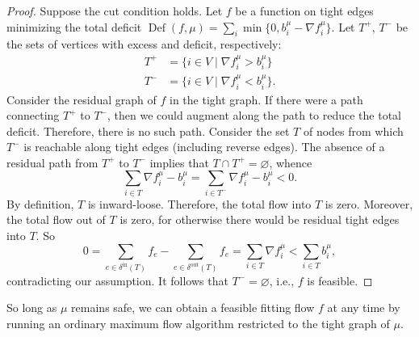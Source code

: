 \documentclass[11pt]{article}
\theoremstyle{definition}
\theoremstyle{definition}
\newcommand{\fu}{f^{\mu}}
\newcommand{\nfiu}{\nabla \fu_i}
\newcommand{\biu}{b_{i}^{\mu}}
\newcommand{\din}{\delta^{\text{in}}}
\newcommand{\dout}{\delta^{\text{out}}}
\DeclareMathOperator{\Def}{Def}
\begin{document}
	\begin{proof}
		Suppose the cut condition holds. Let $f$ be a function on tight edges minimizing
		the total deficit $\Def(f, \mu) = \sum_i \min\{0, \biu - \nfiu\}$. Let
		$T^+$, $T^-$ be the sets of vertices with excess and deficit, respectively:
		\begin{align*}
			T^+ &= \{i \in V \mid \nfiu > \biu \} \\
			T^- &= \{i \in V \mid \nfiu < \biu \}.
		\end{align*}
		Consider the residual graph of $f$ in the tight graph. If there were a path
		connecting $T^+$ to $T^-$, then we could augment along the path
		to reduce the total deficit. Therefore, there is no such path. Consider the
		set $T$ of nodes from which $T^-$ is reachable along tight edges (including reverse edges).
		The absence of a residual path from $T^+$ to $T^-$
        implies that $T \cap T^+ = \varnothing$, whence
		\[ \sum_{i \in T} \nfiu - \biu = \sum_{i \in T^-} \nfiu - \biu < 0. \]
		By definition, $T$ is inward-loose. Therefore, the total flow into $T$ is zero.
        Moreover, the total flow out of $T$ is zero, for otherwise there would be
        residual tight edges into $T$. So
		\[ 0 = \sum_{e \in \din(T)} f_e - \sum_{e \in \dout(T)} f_e
		     = \sum_{i \in T} \nfiu < \sum_{i \in T} \biu, \]
		contradicting our assumption. It follows that $T^- = \varnothing$, i.e., $f$
		is feasible.
	\end{proof}
    So long as $\mu$ remains safe, we can obtain a feasible fitting flow $f$ at any time
    by running an ordinary maximum flow algorithm restricted to the tight graph of $\mu$.
    
\end{document}
